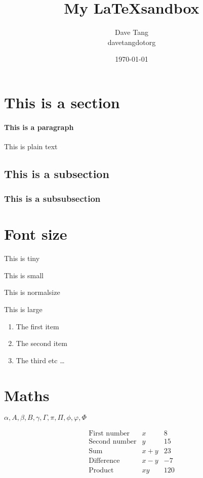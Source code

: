 \documentclass[a4paper, 12pt]{article}
\begin{document}
\title{My \LaTeX sandbox}
\date{\today}
\author{Dave Tang\\ davetangdotorg}
\maketitle


\section{This is a section}

\paragraph{This is a paragraph}

This is plain text

\subsection{This is a subsection}

\subsubsection{This is a subsubsection}

\section{Font size}

\tiny{This is tiny}

\small{This is small}

\normalsize{This is normalsize}

\large{This is large}

\begin{enumerate}
  \item The first item
  \item The second item
  \item The third etc \ldots
\end{enumerate}

\section{Maths}

$\alpha, A, \beta, B, \gamma, \Gamma, \pi, \Pi, \phi, \varphi, \Phi$

\[ \begin{array}{lcr}
\mbox{First number} & x & 8 \\
\mbox{Second number} & y & 15 \\
\mbox{Sum} & x + y & 23 \\
\mbox{Difference} & x - y & -7 \\
\mbox{Product} & xy & 120 \end{array}\] 
\end{document}
